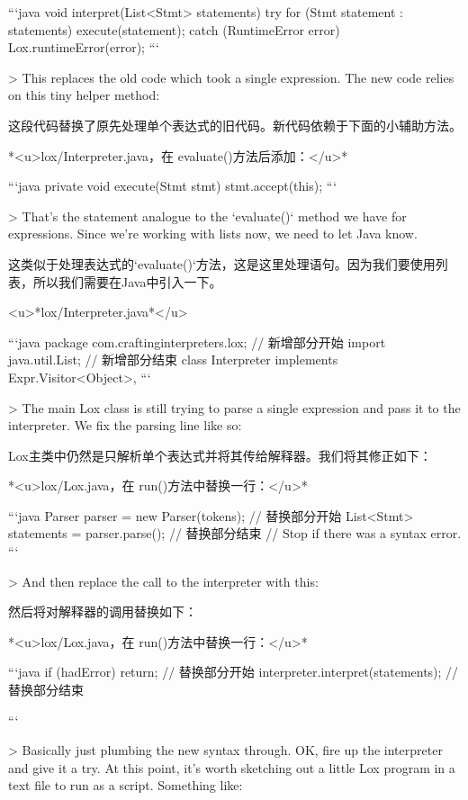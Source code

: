 \documentclass[cn,11pt,chinese]{elegantbook}
\begin{document}
{{{{```java
  void interpret(List<Stmt> statements) {
    try {
      for (Stmt statement : statements) {
        execute(statement);
      }
    } catch (RuntimeError error) {
      Lox.runtimeError(error);
    }
  }
```

> This replaces the old code which took a single expression. The new code relies on this tiny helper method:

这段代码替换了原先处理单个表达式的旧代码。新代码依赖于下面的小辅助方法。

*<u>lox/Interpreter.java，在 evaluate()方法后添加：</u>*

```java
  private void execute(Stmt stmt) {
    stmt.accept(this);
  }
```

> That’s the statement analogue to the `evaluate()` method we have for expressions. Since we’re working with lists now, we need to let Java know.

这类似于处理表达式的`evaluate()`方法，这是这里处理语句。因为我们要使用列表，所以我们需要在Java中引入一下。

<u>*lox/Interpreter.java*</u>

```java
package com.craftinginterpreters.lox;
// 新增部分开始
import java.util.List;
// 新增部分结束
class Interpreter implements Expr.Visitor<Object>,
```

> The main Lox class is still trying to parse a single expression and pass it to the interpreter. We fix the parsing line like so:

Lox主类中仍然是只解析单个表达式并将其传给解释器。我们将其修正如下：

*<u>lox/Lox.java，在 run()方法中替换一行：</u>*

```java
    Parser parser = new Parser(tokens);
    // 替换部分开始
    List<Stmt> statements = parser.parse();
    // 替换部分结束
    // Stop if there was a syntax error.
```

> And then replace the call to the interpreter with this:

然后将对解释器的调用替换如下：

*<u>lox/Lox.java，在 run()方法中替换一行：</u>*

```java
    if (hadError) return;
    // 替换部分开始
    interpreter.interpret(statements);
    // 替换部分结束
  }
```

> Basically just plumbing the new syntax through. OK, fire up the interpreter and give it a try. At this point, it’s worth sketching out a little Lox program in a text file to run as a script. Something like:

}}}
\end{document}
